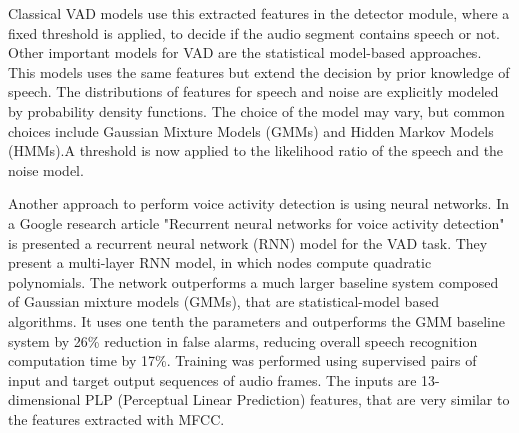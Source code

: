 \documentclass[../main.tex]{subfiles}
\begin{document}
Classical VAD models use this extracted features in the detector module, where a fixed threshold is applied, to decide if the audio segment contains speech or not. Other important models for VAD are the statistical model-based approaches. This models uses the same features but extend the decision by prior knowledge of speech. The distributions of features for speech and noise are explicitly modeled by probability density functions. The choice of the model may vary, but common choices include Gaussian Mixture Models (GMMs) and Hidden Markov Models (HMMs).A threshold is now applied to the likelihood ratio of the speech and the noise model.

Another approach to perform voice activity detection is using neural networks. In a Google research article "Recurrent neural networks for voice activity detection" \cite{googleRNN} is presented a recurrent neural network (RNN) model for the VAD task. They present a multi-layer RNN model, in which nodes compute quadratic polynomials. The network outperforms a much larger baseline system composed of Gaussian mixture models (GMMs), that are statistical-model based algorithms. It uses one tenth the parameters and outperforms the GMM baseline system by 26\% reduction in false alarms, reducing overall speech recognition computation time by 17\%. Training was performed using supervised pairs of input and target output sequences of audio frames. The inputs are 13-dimensional PLP (Perceptual Linear Prediction) features, that are very similar to the features extracted with MFCC. 
 
\end{document}
